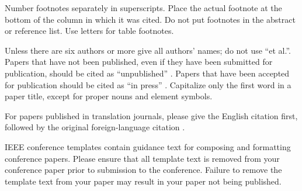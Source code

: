 \documentclass[conference]{IEEEtran}
\begin{document}
Number footnotes separately in superscripts. Place the actual footnote at 
the bottom of the column in which it was cited. Do not put footnotes in the 
abstract or reference list. Use letters for table footnotes.

Unless there are six authors or more give all authors' names; do not use 
``et al.''. Papers that have not been published, even if they have been 
submitted for publication, should be cited as ``unpublished'' \cite{b4}. Papers 
that have been accepted for publication should be cited as ``in press'' \cite{b5}. 
Capitalize only the first word in a paper title, except for proper nouns and 
element symbols.

For papers published in translation journals, please give the English 
citation first, followed by the original foreign-language citation \cite{b6}.




\vspace{12pt}
\color{red}
IEEE conference templates contain guidance text for composing and formatting conference papers. Please ensure that all template text is removed from your conference paper prior to submission to the conference. Failure to remove the template text from your paper may result in your paper not being published.
\end{document}

